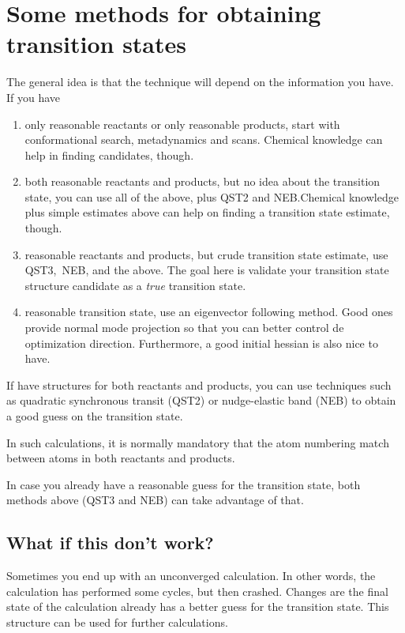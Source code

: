 \section{Some methods for obtaining transition states}

The general idea is that the technique will depend on the information you have.
If you have
\begin{enumerate}
	\item only reasonable reactants or only reasonable products, start with conformational search,
	      metadynamics and scans. Chemical knowledge can help in finding candidates,
	      though.
	\item both reasonable reactants and products, but no idea about the transition state, you can use
	      all of the above, plus QST2 and NEB.\@ Chemical knowledge plus simple estimates
	      above can help on finding a transition state estimate, though.
	\item reasonable reactants and products, but crude transition state
	      estimate, use QST3,\ NEB, and the above. The
	      goal here is validate your transition state structure candidate as a
	      \emph{true} transition state.
	\item reasonable transition state, use an eigenvector following method. Good ones
	      provide normal mode projection so that you can better control de optimization
	      direction. Furthermore, a good initial hessian is also nice to have.
\end{enumerate}

If have structures for both reactants and products, you can use techniques such
as quadratic synchronous transit (QST2) or nudge-elastic band (NEB) to obtain a
good guess on the transition state.

In such calculations, it is normally mandatory that the atom numbering match
between atoms in both reactants and products.

In case you already have a reasonable guess for the transition state, both
methods above (QST3 and NEB) can take advantage of that.

\subsection{What if this don't work?}

Sometimes you end up with an unconverged calculation.
In other words, the calculation has performed some cycles, but then crashed.
Changes are the final state of the calculation already has a better guess for
the transition state.
This structure can be used for further calculations.

